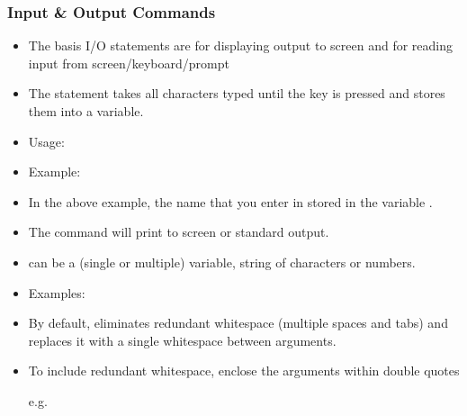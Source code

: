 \documentclass[10pt,t]{beamer}
\begin{document}
\begin{frame}
  \frametitle{Input \& Output Commands}
  \begin{itemize}
    \item The basis I/O statements are  for displaying output to screen and  for reading input from screen/keyboard/prompt
    \item The  statement takes all characters typed until the \Verblubrown{{\Enter}} key is pressed and stores them into a variable.
    \item Usage: 
    \item Example: 
    \item[] 
    \item In the above example, the name that you enter in stored in the variable .
    \item[]
    \item The  command will print  to screen or standard output. 
    \item {} can be a (single or multiple) variable, string of characters or numbers.
      \framebreak
    \item Examples:
    \item By default,  eliminates redundant whitespace (multiple spaces and tabs) and replaces it with a single whitespace between arguments. 
    \item To include redundant whitespace, enclose the arguments within double quotes
    \item[e.g.] 
  \end{itemize}


\end{frame}
\end{document}
